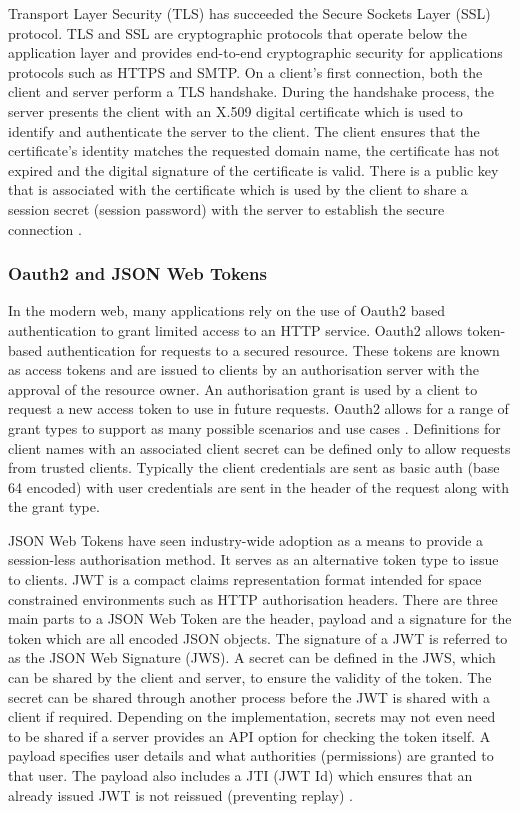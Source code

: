 Transport Layer Security (TLS) has succeeded the Secure Sockets Layer (SSL) protocol.
TLS and SSL are cryptographic protocols that operate below the application layer and provides end-to-end cryptographic security for
applications protocols such as HTTPS and SMTP.
On a client's first connection, both the client and server perform a TLS handshake. During the handshake process, the server presents
the client with an X.509 digital certificate which is used to identify and authenticate the server to the client.
The client ensures that the certificate's identity matches the requested domain name, the certificate has not expired and the digital 
signature of the certificate is valid.
There is a public key that is associated with the certificate which is used by the client to share a session secret (session password)
with the server to establish the secure connection  \cite{durumeric2013analysis}\cite{thomas2000ssl}.

\subsubsection{Oauth2 and JSON Web Tokens}
In the modern web, many applications rely on the use of Oauth2 based authentication to grant limited access to an HTTP service.
Oauth2 allows token-based authentication for requests to a secured resource.
These tokens are known as access tokens and are issued to clients by an authorisation server with the approval of the resource
owner.
An authorisation grant is used by a client to request a new access token to use in future requests.
Oauth2 allows for a range of grant types to support as many possible scenarios and use cases \cite{jones2015json}. 
Definitions for client names with an associated client secret can be defined only to allow requests from trusted clients.
Typically the client credentials are sent as basic auth (base 64 encoded) with user credentials are sent in the header 
of the request along with the grant type.

JSON Web Tokens have seen industry-wide adoption as a means to provide a session-less authorisation method.
It serves as an alternative token type to issue to clients.
JWT is a compact claims representation format intended for space constrained environments such as HTTP authorisation headers.
There are three main parts to a JSON Web Token are the header, payload and a signature for the token which are all encoded
JSON objects. 
The signature of a JWT is referred to as the JSON Web Signature (JWS).  
A secret can be defined in the JWS, which can be shared by the client and server, to ensure the validity of the token.
The secret can be shared through another process before the JWT is shared with a client if required.
Depending on the implementation, secrets may not even need to be shared if a server provides an API option for checking the token itself.
A payload specifies user details and what authorities (permissions) are granted to that user. The payload also includes a
JTI (JWT Id) which ensures that an already issued JWT is not reissued (preventing replay) \cite{bradley2015json}.

